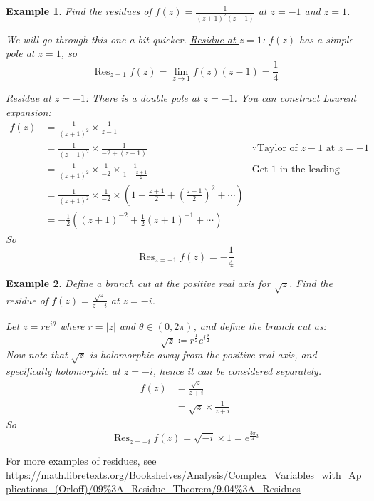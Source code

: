\documentclass[a4paper]{article}
\newtheorem{example}{Example}
\newcommand{\res}{\mathop{\mathrm{Res}}}
\begin{document}
\begin{example}
    Find the residues of $f(z) = \frac{1}{(z+1)^2 (z-1)}$ at $z=-1$ and $z=1$.
    
    We will go through this one a bit quicker.
    \underline{Residue at $z=1$}: $f(z)$ has a simple pole at $z=1$, so
    \begin{equation*}
        \res_{z=1}f(z) = \lim_{z\rightarrow 1} f(z) (z-1) = \frac{1}{4}
    \end{equation*}

    \underline{Residue at $z=-1$}: There is a double pole at $z=-1$. You can construct Laurent expansion:
    \begin{align*}
        f(z) &= \frac{1}{(z+1)^2} \times \frac{1}{z-1}  \\
        &= \frac{1}{\left( z-1 \right)^2} \times \frac{1}{-2 + \left( z+1 \right)} &\because \text{Taylor of }z-1 \text{ at } z = -1 \\
        &= \frac{1}{(z+1)^2} \times \frac{1}{-2} \times \frac{1}{1 - \frac{z+1}{2}} &\text{Get 1 in the leading term} \\
        &= \frac{1}{(z+1)^2} \times \frac{1}{-2} \times \left(1 + \frac{z+1}{2} + \left( \frac{z+1}{2} \right)^2 + \cdots\right) \\
        &= -\frac{1}{2} \left( \left( z+1 \right)^{-2} + \frac{1}{2}\left( z+1 \right)^{-1} + \cdots \right)
    \end{align*}
    So
    \begin{equation*}
        \res_{z=-1} f(z) = -\frac{1}{4}
    \end{equation*}
\end{example}

\begin{example}
    Define a branch cut at the positive real axis for $\sqrt{z}$. Find the residue of $f(z) = \frac{\sqrt{z}}{z+i}$ at $z=-i$.

    Let $z=r e^{i \theta}$ where $r = |z|$ and $\theta \in \left( 0, 2\pi \right)$, and define the branch cut as:
    \begin{equation*}
        \sqrt{z} \coloneqq r^{\frac{1}{2}}e^{i \frac{\theta}{2}}
    \end{equation*}
    Now note that $\sqrt{z}$ is holomorphic away from the positive real axis, and specifically holomorphic at $z=-i$, hence it can be considered separately.
    \begin{align*}
        f(z) &= \frac{\sqrt{z}}{z + i} \\
        &= \sqrt{z} \times \frac{1}{z+i}
    \end{align*}
    So
    \begin{equation*}
        \res_{z=-i} f(z) = \sqrt{-i} \times 1 = e^{\frac{3\pi}{4}i}
    \end{equation*}
\end{example}

For more examples of residues, see \url{https://math.libretexts.org/Bookshelves/Analysis/Complex_Variables_with_Applications_(Orloff)/09%3A_Residue_Theorem/9.04%3A_Residues}
\end{document}
